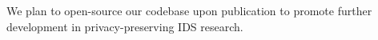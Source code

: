 
 We plan to open-source our codebase upon publication to promote further development in privacy-preserving IDS research. %


